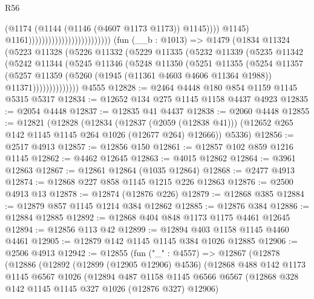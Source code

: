 \begin{lexlean}{R56}
\begin{coremodule}
                                                            (@1174
                                                              (@1144
                                                                (@1146 (@4607 @1173 @1173))
                                                                @1145))))
                                                        @1145)
                                                      @1161)))))))))))))))))))))))))
    (fun (__b : @1013) =>
    @1479
      (@1834
        @11324
        (@5223
          @11328
          (@5226
            @11332
            (@5229
              @11335
              (@5232
                @11339
                (@5235
                  @11342
                  (@5242
                    @11344
                    (@5245
                      @11346
                      (@5248
                        @11350
                        (@5251
                          @11355
                          (@5254
                            @11357
                            (@5257
                              @11359
                              (@5260 (@1945 (@11361 @4603 @4606 @11364 @1988)) @11371))))))))))))))
    @4555
@12828 := @2464 @4448 @180 @854 @1159 @1145 @5315 @5317
@12834 := @12652 @134 @275 @1145 @1158 @4437 @4923
@12835 := @2054 @4448
@12837 := @12835 @41 @4437
@12838 := @2060 @4448
@12855 := @12821
    (@12828
      (@12834
        (@12837 (@2059 (@12838 @41)))
        (@12652 @265 @142 @1145 @1145 @264 @1026 (@12677 @264) @12666))
      @5336)
@12856 := @2517 @4913
@12857 := @12856 @150
@12861 := @12857 @102 @859 @1216 @1145
@12862 := @4462 @12645
@12863 := @4015 @12862
@12864 := @3961 @12863
@12867 := @12861 @12864 (@1035 @12864)
@12868 := @2477 @4913
@12874 := @12868 @227 @858 @1145 @1215 @226 @12863
@12876 := @2500 @4913 @13
@12878 := @12874 (@12876 @226)
@12879 := @12868 @385
@12884 := @12879 @857 @1145 @1214 @384 @12862
@12885 := @12876 @384
@12886 := @12884 @12885
@12892 := @12868 @404 @848 @1173 @1175 @4461 @12645
@12894 := @12856 @113 @42
@12899 := @12894 @403 @1158 @1145 @4460 @4461
@12905 := @12879 @142 @1145 @1145 @384 @1026 @12885
@12906 := @2506 @4913
@12942 := @12855
    (fun ("_" : @4557) =>
    @12867
      (@12878
        (@12886
          (@12892
            (@12899 (@12905 @12906) @4536)
            (@12868
              @488
              @142
              @1173
              @1145
              @6567
              @1026
              (@12894
                @487
                @1158
                @1145
                @6566
                @6567
                (@12868 @328 @142 @1145 @1145 @327 @1026 (@12876 @327) @12906)

\end{coremodule}
\end{lexlean}
